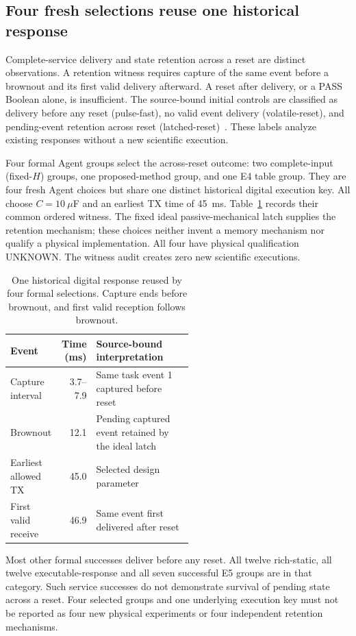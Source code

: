 \subsection{Four fresh selections reuse one historical response}
Complete-service delivery and state retention across a reset are distinct
observations. A retention witness requires capture of the same event before
a brownout and its first valid delivery afterward. A reset after delivery,
or a PASS Boolean alone, is insufficient. The source-bound initial controls
are classified as delivery before any reset (pulse-fast), no valid event
delivery (volatile-reset), and pending-event retention across reset
(latched-reset)~\cite{ordered}. These labels analyze existing responses without
a new scientific execution.

Four formal Agent groups select the across-reset outcome: two complete-input
(fixed-$H$) groups, one proposed-method group, and one E4 table group.
They are four fresh Agent choices but share one distinct historical digital
execution key. All choose $C=10~\mu$F and an earliest TX time of 45~ms.
Table~\ref{tab:order} records their common ordered witness. The fixed ideal
passive-mechanical latch supplies the retention mechanism; these choices
neither invent a memory mechanism nor qualify a physical implementation.
All four have physical qualification UNKNOWN. The witness audit creates
zero new scientific executions.

\begin{table}[htbp]
\centering\small
\caption{One historical digital response reused by four formal selections.
Capture ends before brownout, and first valid reception follows brownout.}
\label{tab:order}
\begin{tabular}{@{}lrp{0.53\linewidth}@{}}\toprule
Event & Time (ms) & Source-bound interpretation \\\midrule
Capture interval & 3.7--7.9 & Same task event 1 captured before reset \\
Brownout & 12.1 & Pending captured event retained by the ideal latch \\
Earliest allowed TX & 45.0 & Selected design parameter \\
First valid receive & 46.9 & Same event first delivered after reset \\
\bottomrule\end{tabular}
\end{table}

Most other formal successes deliver before any reset. All twelve rich-static,
all twelve executable-response and all seven successful E5 groups are in that
category. Such service successes do not demonstrate survival of pending state
across a reset. Four selected groups and one underlying execution key must not
be reported as four new physical experiments or four independent retention
mechanisms.

